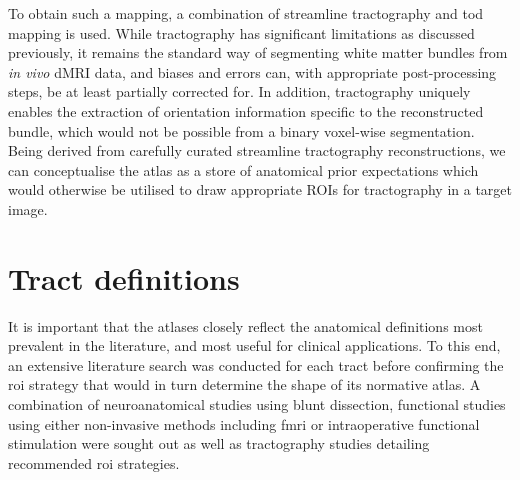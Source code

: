 To obtain such a mapping, a combination of streamline tractography and \gls{tod} mapping \autocite{Dhollander2014} is used.
While tractography has significant limitations as discussed previously, it remains the standard way of segmenting white matter bundles from \textit{in vivo} dMRI data, and biases and errors can, with appropriate post-processing steps, be at least partially corrected for.
In addition, tractography uniquely enables the extraction of orientation information specific to the reconstructed bundle, which would not be possible from a binary voxel-wise segmentation.
Being derived from carefully curated streamline tractography reconstructions, we can conceptualise the atlas as a store of anatomical prior expectations which would otherwise be utilised to draw appropriate ROIs for tractography in a target image.

\section{Tract definitions}

It is important that the atlases closely reflect the anatomical definitions most prevalent in the literature, and most useful for clinical applications.
To this end, an extensive literature search was conducted for each tract before confirming the \gls{roi} strategy that would in turn determine the shape of its normative atlas.
A combination of neuroanatomical studies using blunt dissection, functional studies using either non-invasive methods including \gls{fmri} or intraoperative functional stimulation were sought out as well as tractography studies detailing recommended \gls{roi} strategies.

